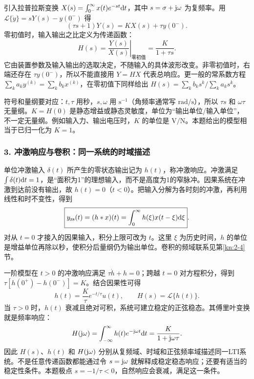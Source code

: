 引入拉普拉斯变换 $X(s)=\int_{0^-}^{\infty}x(t)e^{-st}\mathrm{d} t$，其中 $s=\sigma+\mathrm{j}\omega$ 为复频率。用
$\mathcal L\{\dot y\}=sY(s)-y(0^-)$ 得
\[
(\tau s+1)Y(s)=KX(s)+\tau y(0^-).
\]
零初值时，输入输出之比定义为传递函数：
\[
\boxed{H(s)=\left.\frac{Y(s)}{X(s)}\right|_{\text{零初值}}
=\frac{K}{1+\tau s}}.
\]
它由装置参数及输入输出的选取决定，不随输入的具体波形改变。非零初值时，右端还存在 $\tau y(0^-)$，所以不能直接用 $Y=HX$ 代表总响应。更一般的常系数方程
$\sum_k a_k y^{(k)}=\sum_k b_k x^{(k)}$，在零初值下同样给出 $H(s)=\sum_k b_ks^k/\sum_k a_ks^k$。

符号和量纲要对应：$t,\tau$ 用秒，$s,\omega$ 用 $\mathrm{s}^{-1}$（角频率通常写 $\mathrm{rad/s}$），所以 $\tau s$ 和 $\omega\tau$ 无量纲。$K=H(0)$ 是静态增益或静态灵敏度，单位为“输出单位/输入单位”，不一定无量纲。例如输入力、输出电压时，$K$ 的单位是 $\mathrm{V/N}$。本题给出的模型相当于已归一化为 $K=1$。

\subsubsection*{3. 冲激响应与卷积：同一系统的时域描述}
单位冲激输入 $\delta(t)$ 所产生的零状态输出记为 $h(t)$，称冲激响应。冲激满足 $\int\delta(t)\mathrm{d} t=1$，是“面积为1”的理想输入，而不是高度为1的窄脉冲。因果系统在冲激到达前没有输出，故 $h(t)=0$（$t<0$）。把输入分解为各时刻的冲激，再利用线性和时不变性，得到
\[
\boxed{y_{\mathrm{zs}}(t)=(h*x)(t)
=\int_{0}^{\infty}h(\xi)x(t-\xi)\mathrm{d}\xi}.
\]
对从 $t=0$ 才接入的因果输入，积分上限可改为 $t$。这里 $\xi$ 为历史时间，$h$ 的单位是增益单位再除以秒，使积分后量纲仍为输出单位。卷积的频域联系见第\ref{kn:2-4}节。

一阶模型在 $t>0$ 的冲激响应满足 $\tau\dot h+h=0$；跨越 $t=0$ 对方程积分，得到 $\tau[h(0^+)-h(0^-)]=K$。结合因果性可得
\[
\boxed{h(t)=\frac{K}{\tau}e^{-t/\tau}u(t)},\qquad
H(s)=\mathcal L\{h(t)\}.
\]
当 $\tau>0$ 时，$h(t)$ 衰减且绝对可积，系统可建立稳定的正弦稳态。其傅里叶变换就是频率响应：
\[
H(\mathrm{j}\omega)=\int_{-\infty}^{\infty}h(t)e^{-\mathrm{j}\omega t}\mathrm{d} t
=\frac{K}{1+\mathrm{j}\omega\tau}.
\]
因此 $H(s)$、$h(t)$ 和 $H(\mathrm{j}\omega)$ 分别从复频域、时域和正弦频率域描述同一LTI系统。不是任意传递函数都能通过令 $s=\mathrm{j}\omega$ 就解释成稳定稳态响应；还要有适当的稳定性条件。本题极点 $s=-1/\tau<0$，自然响应会衰减，满足这一条件。

